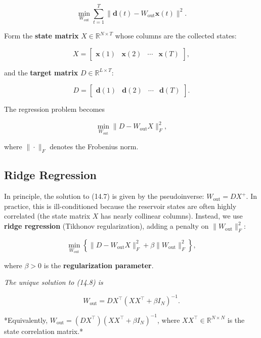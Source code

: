 \[
\min_{W_{\text{out}}} \sum_{t=1}^{T} \|\mathbf{d}(t) - W_{\text{out}}\mathbf{x}(t)\|^2.
\]

Form the \textbf{state matrix} $X \in \mathbb{R}^{N \times T}$ whose columns are the collected states:

\[
X = \begin{bmatrix} \mathbf{x}(1) & \mathbf{x}(2) & \cdots & \mathbf{x}(T) \end{bmatrix},
\]

and the \textbf{target matrix} $D \in \mathbb{R}^{L \times T}$:

\[
D = \begin{bmatrix} \mathbf{d}(1) & \mathbf{d}(2) & \cdots & \mathbf{d}(T) \end{bmatrix}.
\]

The regression problem becomes

\begin{equation}\label{eq:14.7}\tag{14.7}
\min_{W_{\text{out}}} \|D - W_{\text{out}} X\|_F^2,
\end{equation}

where $\|\cdot\|_F$ denotes the Frobenius norm.

\subsection{Ridge Regression}\label{sec:14.5.3}

In principle, the solution to (14.7) is given by the pseudoinverse: $W_{\text{out}} = D X^+$. In practice, this is ill-conditioned because the reservoir states are often highly correlated (the state matrix $X$ has nearly collinear columns). Instead, we use \textbf{ridge regression} (Tikhonov regularization), adding a penalty on $\|W_{\text{out}}\|_F^2$:

\begin{equation}\label{eq:14.8}\tag{14.8}
\min_{W_{\text{out}}} \left\{ \|D - W_{\text{out}} X\|_F^2 + \beta \|W_{\text{out}}\|_F^2 \right\},
\end{equation}

where $\beta > 0$ is the \textbf{regularization parameter}.

\begin{proposition}\label{prop:14.2.}
\textit{The unique solution to (14.8) is}

\begin{equation}\label{eq:14.9}\tag{14.9}
W_{\text{out}} = D X^\top (X X^\top + \beta I_N)^{-1}.
\end{equation}

*Equivalently, $W_{\text{out}} = (D X^\top) (X X^\top + \beta I_N)^{-1}$, where $X X^\top \in \mathbb{R}^{N \times N}$ is the state correlation matrix.*
\end{proposition}


